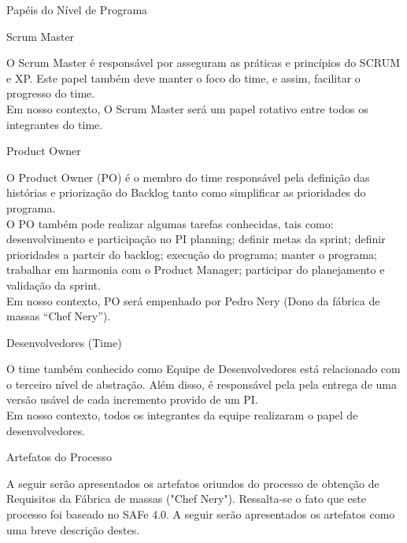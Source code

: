 {{\large{Papéis do Nível de Programa\\}}

{
	\large{Scrum Master\\}

	\tab O Scrum Master é responsável por asseguram as práticas e princípios do SCRUM e XP. Este papel também deve manter o foco do time, e assim, facilitar o progresso do time. \\
	\tab Em nosso contexto, O Scrum Master será um papel rotativo entre todos os integrantes do time. \\
}

{
	\large{Product Owner\\}

	\tab O Product Owner (PO) é o membro do time responsável pela definição das histórias e priorização do Backlog tanto como simplificar as prioridades do programa. \\
	\tab O PO também pode realizar algumas tarefas conhecidas, tais como: desenvolvimento e participação no PI planning; definir metas da sprint; definir prioridades  a partcir do backlog; execução do programa; manter o programa; trabalhar em harmonia com o Product Manager; participar do planejamento e validação da sprint. \\
	\tab Em nosso contexto, PO será empenhado por Pedro Nery (Dono da fábrica de massas “Chef Nery”). \\
}

{
	\large{Desenvolvedores (Time)\\}

	\tab O time também conhecido como Equipe de Desenvolvedores está relacionado com o terceiro nível de abstração. Além disso, é responsável pela pela entrega de uma versão usável de cada incremento provido de um PI. \\
	\tab Em nosso contexto, todos os integrantes da equipe realizaram o papel de desenvolvedores. \\

}

{
	\large{Artefatos do Processo \\}

	\tab A seguir serão apresentados os artefatos oriundos do processo de obtenção de Requisitos da Fábrica de massas ("Chef Nery"). Ressalta-se o fato que este processo foi baseado no SAFe 4.0. A seguir serão apresentados os artefatos como uma breve descrição destes. \\

}

}
